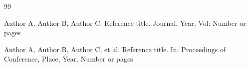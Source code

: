\documentclass{SCIS2021}
\theoremstyle{exampstyle}
\begin{document}
	
	
	
%		
%		
%		
	\begin{thebibliography}{99}

         Author A, Author B, Author C. Reference title. Journal, Year, Vol: Number or pages
        
         Author A, Author B, Author C, et al. Reference title. In: Proceedings of Conference, Place, Year. Number or pages
        
        \end{thebibliography}

	
\end{document}
